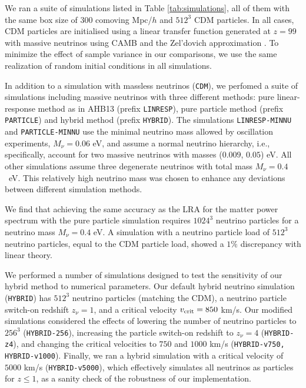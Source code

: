 \documentclass[useAMS, usenatbib]{mnras}
\begin{document}
We ran a suite of simulations listed in Table \ref{tab:simulations}, all of them with the same box size of $300$ comoving Mpc/$h$ and $512^3$ CDM particles. In all cases, CDM particles are initialised using a linear transfer function generated at $z=99$ with massive neutrinos using CAMB \citep{CAMB_neutrinos} and the Zel'dovich approximation \citep{Zeldovich_1970}. To minimize the effect of sample variance in our comparisons, we use the same realization of random initial conditions in all simulations.

In addition to a simulation with massless neutrinos (\texttt{CDM}), we perfomed a suite of simulations including massive neutrinos with three different methods: pure linear-response method as in AHB13 (prefix \texttt{LINRESP}), pure particle method (prefix \texttt{PARTICLE}) and hybrid method (prefix \texttt{HYBRID}). The simulations \texttt{LINRESP-MINNU} and \texttt{PARTICLE-MINNU} use the minimal neutrino mass allowed by oscillation experiments, $M_\nu = 0.06$ eV, and assume a normal neutrino hierarchy, i.e., specifically, account for two massive neutrinos with masses ($0.009$, $0.05$) eV. All other simulations assume three degenerate neutrinos with total mass $M_\nu = 0.4$~eV. This relatively high neutrino mass was chosen to enhance any deviations between different simulation methods.

We find that achieving the same accuracy as the LRA for the matter power spectrum with the pure particle simulation requires $1024^3$ neutrino particles for a neutrino mass $M_\nu = 0.4$ eV. A simulation with a neutrino particle load of $512^3$ neutrino particles, equal to the CDM particle load, showed a $1\%$ discrepancy with linear theory.


We performed a number of simulations designed to test the sensitivity of our hybrid method to numerical parameters. Our default hybrid neutrino simulation (\texttt{HYBRID}) has $512^3$ neutrino particles (matching the CDM), a neutrino particle switch-on redshift $z_\nu = 1$, and a critical velocity $v_{\rm crit} = 850$ km/s. Our modified simulations considered the effects of lowering the number of neutrino particles to $256^3$ (\texttt{HYBRID-256}), increasing the particle switch-on redshift to $z_\nu = 4$ (\texttt{HYBRID-z4}), and changing the critical velocities to $750$ and $1000$ km/s (\texttt{HYBRID-v750, HYBRID-v1000}). Finally, we ran a hybrid simulation with a critical velocity of $5000$ km/s (\texttt{HYBRID-v5000}), which effectively simulates all neutrinos as particles for $z \leq 1$, as a sanity check of the robustness of our implementation.
\end{document}
